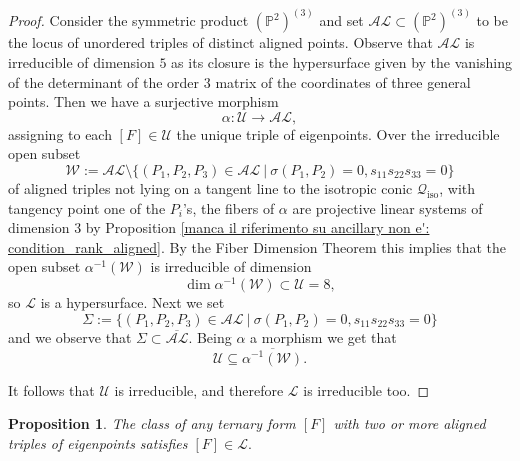 \documentclass{amsart}
\theoremstyle{plain}
\newtheorem{prop}[lemma]{Proposition}
\theoremstyle{definition}
\newcommand{\p}{\mathbb{P}}
\newcommand{\sL}{\mathcal{L}}
\newcommand{\sU}{\mathcal{U}}
\newcommand{\sV}{\mathcal{V}}
\newcommand{\iso}{\mathcal{Q}_{\mathrm{iso}}}
\newcommand{\iii}{\textbf{i}}
\begin{document}
{\begin{proof}
Consider the symmetric product $(\p^2) ^{(3)}$ and set $\mathcal {AL} \subset (\p^2) ^{(3)}$ to be the locus of unordered triples of distinct aligned points. Observe that $\mathcal {AL}$ is irreducible of dimension $5$ as its closure is the hypersurface given by the vanishing of the determinant of the order $3$ matrix of the coordinates of three general points. Then we have a surjective morphism
$$
\alpha : \mathcal{U} \to \mathcal {AL},
$$
assigning to each $[F] \in \mathcal{U}$ the unique triple of eigenpoints. Over the irreducible open subset
$$
\mathcal W := \mathcal {AL}
\setminus \{(P_1,P_2,P_3)\in\mathcal {AL}
\ | \ \sigma(P_1,P_2)=0, s_{11} s_{22} s_{33}=0\}
$$
of aligned triples not lying
on a tangent line to the isotropic conic $\iso$, with tangency point one of the $P_i$'s, the fibers of $\alpha$ are projective linear systems of dimension $3$ by
Proposition \ref{manca il riferimento su ancillary    non e': condition_rank_aligned}. By the Fiber Dimension Theorem this implies that the open subset $\alpha ^{-1} (\mathcal W)$ is irreducible of dimension
$$
\dim \alpha ^{-1} (\mathcal W)
\subset \sU=8 ,
$$
so $\sL$ is a hypersurface. Next we set
$$
\Sigma:=\{(P_1,P_2,P_3)\in\mathcal {AL}
\ | \ \sigma(P_1,P_2)=0, s_{11} s_{22} s_{33}=0\}
$$
and we observe that $\Sigma \subset \overline {\mathcal {AL}}$. Being $\alpha$ a morphism we get
that
$$
\sU \subseteq \overline {\alpha^{-1} (\mathcal W)}.
$$

%



It follows that $\sU$ is irreducible, and therefore $\sL$ is irreducible too.
\end{proof}

\begin{prop}
The class of any ternary form $[F]$ with two or more aligned triples of eigenpoints satisfies
$
[F] \in \sL.
$


\end{prop}}
\end{document}
